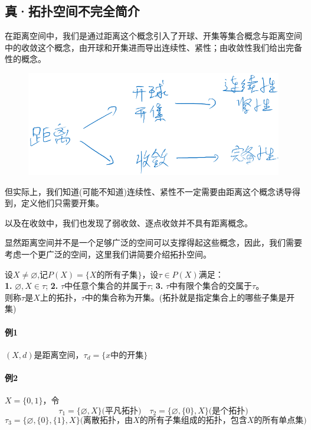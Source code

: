 \subsection{真·拓扑空间不完全简介}
在距离空间中，我们是通过距离这个概念引入了开球、开集等集合概念与距离空间中的收敛这个概念，由开球和开集进而导出连续性、紧性；由收敛性我们给出完备性的概念。
\begin{figure}[htbp]
    \center
    \includegraphics[scale=0.4]{./fig/2.2.1.png}
\end{figure}
但实际上，我们知道(可能不知道)连续性、紧性不一定需要由距离这个概念诱导得到，定义他们只需要开集。

以及在收敛中，我们也发现了弱收敛、逐点收敛并不具有距离概念。

显然距离空间并不是一个足够广泛的空间可以支撑得起这些概念，因此，我们需要考虑一个更广泛的空间，这里我们讲简要介绍拓扑空间。
\begin{definition}[拓扑]
    设$X \neq \varnothing$,记$P(X)=\{X\text{的所有子集}\}$，设$\tau \in P(X)$满足：\\
    \textbf{1.} $\varnothing,X \in \tau$; \qquad \textbf{2.} $\tau$中任意个集合的并属于$\tau$; \qquad \textbf{3.} $\tau$中有限个集合的交属于$\tau$。\\
    则称$\tau$是$X$上的拓扑，$\tau$中的集合称为开集。(拓扑就是指定集合上的哪些子集是开集)
\end{definition}
\paragraph*{例1} $(X,d)$是距离空间，$\tau_d=\{x\text{中的开集}\}$
\paragraph*{例2} $X=\{0,1\}$，令
\[\tau_1=\{\varnothing,X\}\text{(平凡拓扑)} \quad \tau_2=\{\varnothing,\{0\},X\}\text{(是个拓扑)}\]
\[\tau_3=\{\varnothing,\{0\},\{1\},X\}\text{(离散拓扑，由$X$的所有子集组成的拓扑，包含$X$的所有单点集)}\]

